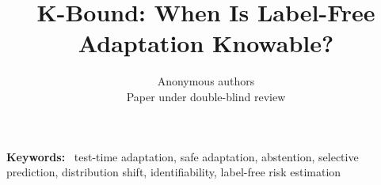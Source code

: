 \documentclass[10pt]{article}
\title{K-Bound: When Is Label-Free Adaptation Knowable?}
\author{Anonymous authors\\Paper under double-blind review}
\date{}
\newenvironment{IEEEkeywords}{\par\noindent\textbf{Keywords:}\ }{\par}
\theoremstyle{plain}
\theoremstyle{definition}
\theoremstyle{remark}
\begin{document}
\maketitle

\begin{abstract}

\end{abstract}

\begin{IEEEkeywords}
test-time adaptation, safe adaptation, abstention, selective prediction, distribution shift,
identifiability, label-free risk estimation
\end{IEEEkeywords}





\clearpage

\end{document}
